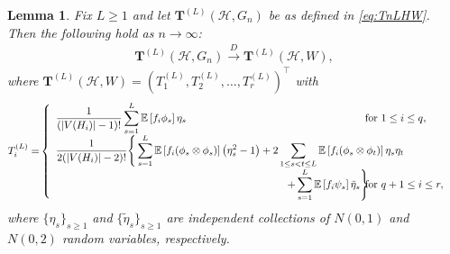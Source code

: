 \documentclass[11pt,reqno]{amsart}
\numberwithin{equation}{section}
\newcommand\dto{\overset{D}{\rightarrow}}
\newtheorem{lemma}{Lemma}[section]
\theoremstyle{definition}
\begin{document}
\begin{lemma}\label{lem:linearTLHW}
Fix $L \geq 1$ and let $\bm T^{(L)}(\mathcal H, G_n)$ be as defined in \eqref{eq:TnLHW}. Then the following hold as $n \rightarrow \infty$: 
\begin{align*} 
 \bm T^{(L)}(\mathcal H, G_n) \dto  \bm T^{(L)}(\mathcal H, W) , 
\end{align*} 
where $\bm T^{(L)}(\mathcal H, W) = (T_1^{(L)}, T_2^{(L)}, \ldots, T_r^{(L)})^\top$ with 
\begin{align*}
T_i^{(L)}  = & \left\{
\begin{array}{*2{>{\displaystyle}l}}
 \dfrac{1}{(|V(H_{i})|-1)!} \sum_{s =1}^L \mathbb{E}\left[f_{i}\phi_{s}\right]\eta_{s}  & \hspace{-0.65in} \text{for } 1 \leq i \leq q , \\ 
 \dfrac{ 1 }{2(|V(H_{i})|-2)!} \Bigg\{ \sum_{s = 1}^L \mathbb{E}\left[f_{i}(\phi_{s}\otimes\phi_{s})\right]\left(\eta_{s}^2 - 1\right) + 2\sum_{ 1 \leq s < t \leq L }\mathbb{E}\left[f_{i} (\phi_{s}\otimes\phi_{t})\right]\eta_{s}\eta_{t} \\ 
 \hspace{3.05in} + \sum_{s = 1}^L\mathbb{E}\left[f_{i}\psi_{s}\right]\tilde \eta_{s} \Bigg\} & \hspace{-0.65in} \text{for } q+1 \leq i \leq r, 
\end{array} 
\right. 
\end{align*}  
where $\{\eta_{s}\}_{s \geq 1}$ and $\{\tilde \eta_{s}\}_{s \geq 1}$ are independent collections of $N(0, 1)$ and $N(0, 2)$ random variables, respectively. 
\end{lemma} 
\end{document}
